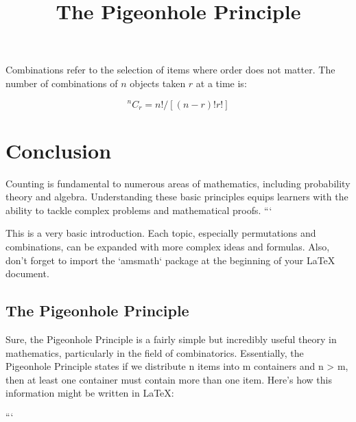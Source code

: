 Combinations refer to the selection of items where order does not matter. The number of combinations of $n$ objects taken $r$ at a time is:

\begin{equation}
^nC_r = n! / [(n-r)!r!]
\end{equation}

\section{Conclusion}

Counting is fundamental to numerous areas of mathematics, including probability theory and algebra. Understanding these basic principles equips learners with the ability to tackle complex problems and mathematical proofs.
```

This is a very basic introduction. Each topic, especially permutations and combinations, can be expanded with more complex ideas and formulas. Also, don't forget to import the `amsmath` package at the beginning of your LaTeX document.

\subsection{The Pigeonhole Principle}
Sure, the Pigeonhole Principle is a fairly simple but incredibly useful theory in mathematics, particularly in the field of combinatorics. Essentially, the Pigeonhole Principle states if we distribute n items into m containers and n > m, then at least one container must contain more than one item. Here's how this information might be written in LaTeX:

```
\documentclass{article}
\usepackage{amsmath}



\title{The Pigeonhole Principle}
\maketitle

The Pigeonhole Principle is a fundamental theorem used in the field of combinatorics. It is a simple yet powerful tool that allows us to determine the minimum number of outcomes in certain types of problems.

\section*{Description}

Suppose that you have $n$ items which you want to distribute into $m$ containers. The Pigeonhole Principle states that, if $n > m$, then at least one container must contain more than one item. In other words, if there are more items than containers, then at least one container must hold at least two items.

